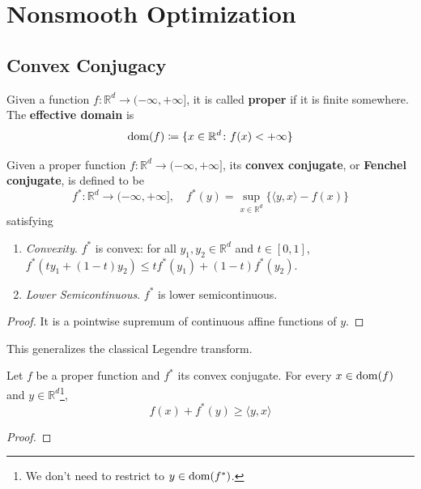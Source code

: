 \section{Nonsmooth Optimization}

\subsection{Convex Conjugacy}

	\begin{definition}
	  \label{def:proper-functions}
		Given a function $f: \mathbb{R}^d \to (-\infty, +\infty]$, it is called \textbf{proper} if it is finite somewhere. The \textbf{effective domain} is 
		\begin{equation}
			\operatorname{dom}(f) \coloneqq \{ x \in \mathbb{R}^d \colon f(x) < +\infty \}
		\end{equation}
	\end{definition}

	\begin{definition}
	  \label{def:convex-fenchel-conjugate}
		Given a proper function $f: \mathbb{R}^d \to (-\infty, +\infty]$, its \textbf{convex conjugate}, or \textbf{Fenchel conjugate}, is defined to be 
		\begin{equation}
			f^\ast: \mathbb{R}^d \to (-\infty, +\infty], \quad f^\ast (y) = \sup_{x \in \mathbb{R}^d} \{ \langle y, x \rangle - f(x) \}
		\end{equation}
		satisfying 
		\begin{enumerate}
			\item \textit{Convexity}. $f^\ast$ is convex: for all $y_1, y_2 \in \mathbb{R}^d$ and $t \in [0, 1]$, $f^\ast(t y_1 + (1 - t) y_2) \leq t f^\ast(y_1) + (1 - t) f^\ast(y_2)$. 
			\item \textit{Lower Semicontinuous}. $f^\ast$ is lower semicontinuous. 
		\end{enumerate}
	\end{definition}
	\begin{proof}
	  It is a pointwise supremum of continuous affine functions of $y$. 
	\end{proof}

	This generalizes the classical Legendre transform. 

	\begin{theorem}
	  \label{thm:fenchel-young-inequality}
		Let $f$ be a proper function and $f^\ast$ its convex conjugate. For every $x \in \operatorname{dom}(f)$ and $y \in \mathbb{R}^d$\footnote{We don't need to restrict to $y \in \operatorname{dom}(f^\ast)$.}, 
		\begin{equation}
		  f(x) + f^\ast (y) \geq \langle y, x \rangle
		\end{equation}
	\end{theorem}
	\begin{proof}
	  
	\end{proof}

